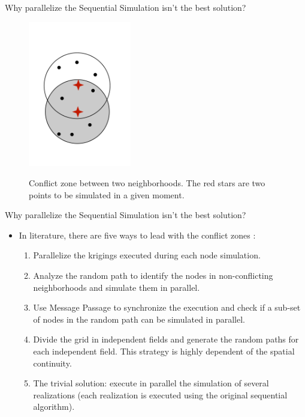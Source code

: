 \begin{frame}{Why parallelize the Sequential Simulation isn't the best solution?}
\begin{figure}[h]
  \caption{Conflict zone between two neighborhoods. The red stars are two points to be simulated in a given moment.}
  \centering
    \includegraphics[width=0.4\textwidth,angle=90]{figs/conflict_zone.pdf}
    \label{conflict_zone}
\end{figure}

\end{frame}

\begin{frame}{Why parallelize the Sequential Simulation isn't the best solution?}
	\begin{itemize}
    	\item In literature, there are five ways to lead with the conflict zones \cite{mariethoz2010general}:
        \begin{enumerate}
        	\item Parallelize the krigings executed during each node simulation. \cite{nunes2010parallelization}
            \item Analyze the random path to identify the nodes in non-conflicting neighborhoods and simulate them in parallel. \cite{vargas2007parallelization}
            \item Use Message Passage to synchronize the execution and check if a sub-set of nodes in the random path can be simulated in parallel. \cite{mariethoz2010general}
            \item Divide the grid in independent fields and generate the random paths for each independent field. This strategy is highly dependent of the spatial continuity. \cite{rasera2015conflict}
            \item The trivial solution: execute in parallel the simulation of several realizations (each realization is executed using the original sequential algorithm).
        \end{enumerate}
    \end{itemize}
\end{frame}

